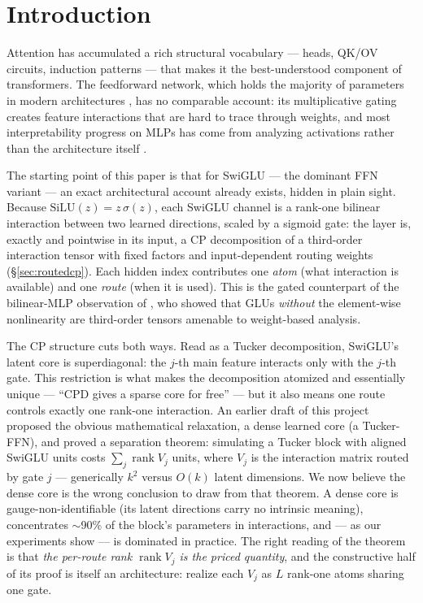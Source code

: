 \documentclass[11pt]{article}
\newcommand{\silu}{\mathrm{SiLU}}
\DeclareMathOperator{\rank}{rank}
\begin{document}
\section{Introduction}

Attention has accumulated a rich structural vocabulary --- heads, QK/OV circuits,
induction patterns \citep{elhage2021mathematical,olsson2022context} --- that makes it
the best-understood component of transformers. The feedforward network, which holds
the majority of parameters in modern architectures
\citep{vaswani2017attention,shazeer2020glu}, has no comparable account: its
multiplicative gating creates feature interactions that are hard to trace through
weights, and most interpretability progress on MLPs has come from analyzing
activations rather than the architecture itself
\citep{bricken2023monosemanticity,dunefsky2024transcoders}.

The starting point of this paper is that for SwiGLU --- the dominant FFN variant ---
an exact architectural account already exists, hidden in plain sight. Because
$\silu(z) = z\,\sigma(z)$, each SwiGLU channel is a rank-one bilinear interaction
between two learned directions, scaled by a sigmoid gate: the layer is, exactly and
pointwise in its input, a CP decomposition of a third-order interaction tensor with
fixed factors and input-dependent routing weights (\S\ref{sec:routedcp}). Each hidden
index contributes one \emph{atom} (what interaction is available) and one
\emph{route} (when it is used). This is the gated counterpart of the bilinear-MLP
observation of \citet{pearce2025bilinear}, who showed that GLUs \emph{without} the
element-wise nonlinearity are third-order tensors amenable to weight-based analysis.

The CP structure cuts both ways. Read as a Tucker decomposition, SwiGLU's latent core
is superdiagonal: the $j$-th main feature interacts only with the $j$-th gate. This
restriction is what makes the decomposition atomized and essentially unique
\citep{kruskal1977three} --- ``CPD gives a sparse core for free'' --- but it also
means one route controls exactly one rank-one interaction. An earlier draft of this
project proposed the obvious mathematical relaxation, a dense learned core (a
Tucker-FFN), and proved a separation theorem: simulating a Tucker block with aligned
SwiGLU units costs $\sum_j \rank V_j$ units, where $V_j$ is the interaction matrix
routed by gate $j$ --- generically $k^2$ versus $O(k)$ latent dimensions. We now
believe the dense core is the wrong conclusion to draw from that theorem. A dense
core is gauge-non-identifiable (its latent directions carry no intrinsic meaning),
concentrates $\sim$90\% of the block's parameters in interactions, and --- as our
experiments show --- is dominated in practice. The right reading of the theorem is
that \emph{the per-route rank $\rank V_j$ is the priced quantity}, and the
constructive half of its proof is itself an architecture: realize each $V_j$ as $L$
rank-one atoms sharing one gate.
\end{document}
